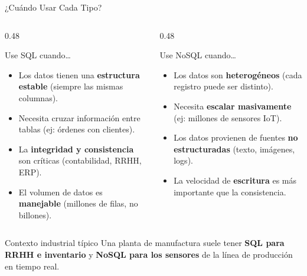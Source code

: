 \documentclass[aspectratio=169]{beamer}
\begin{document}
\begin{frame}{¿Cuándo Usar Cada Tipo?}
  \begin{columns}[T]
    \begin{column}{0.48\textwidth}
      \begin{block}{\faTable\enspace Use SQL cuando\ldots}
        \small
        \begin{itemize}\setlength\itemsep{2pt}
          \item Los datos tienen una \textbf{estructura estable} (siempre las mismas columnas).
          \item Necesita cruzar información entre tablas (ej: órdenes con clientes).
          \item La \textbf{integridad y consistencia} son críticas (contabilidad, RRHH, ERP).
          \item El volumen de datos es \textbf{manejable} (millones de filas, no billones).
        \end{itemize}
      \end{block}
    \end{column}
    \begin{column}{0.48\textwidth}
      \begin{block}{\faCode\enspace Use NoSQL cuando\ldots}
        \small
        \begin{itemize}\setlength\itemsep{2pt}
          \item Los datos son \textbf{heterogéneos} (cada registro puede ser distinto).
          \item Necesita \textbf{escalar masivamente} (ej: millones de sensores IoT).
          \item Los datos provienen de fuentes \textbf{no estructuradas} (texto, imágenes, logs).
          \item La velocidad de \textbf{escritura} es más importante que la consistencia.
        \end{itemize}
      \end{block}
    \end{column}
  \end{columns}
  \vspace{0.1cm}
  \begin{alertblock}{\faIndustry\enspace Contexto industrial típico}
    \small\centering
    Una planta de manufactura suele tener \textbf{SQL para RRHH e inventario} y \textbf{NoSQL para los sensores} de la línea de producción en tiempo real.
  \end{alertblock}
\end{frame}
\end{document}
